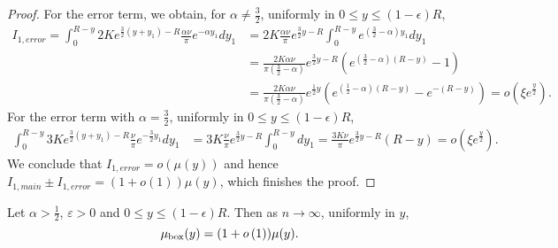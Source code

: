 \begin{proof}
For the error term, we obtain, for $\alpha \not = \frac{3}{2}$, uniformly in $0\leq y\leq (1-\epsilon)R$,
\begin{align*}
I_{1,error}=\int_0^{R-y} 2Ke^{\frac{3}{2}(y+y_1)-R} \frac{\alpha\nu}{\pi} e^{-\alpha y_1} dy_1 &= 2K\frac{\alpha\nu}{\pi} e^{\frac{3}{2}y-R} \int_0^{R-y} e^{\left(\frac{3}{2}-\alpha\right)y_1}dy_1 \\
&= \frac{2K\alpha\nu}{\pi\left(\frac{3}{2}-\alpha\right)}e^{\frac{3}{2}y-R} \left(e^{\left(\frac{3}{2}-\alpha\right)(R-y)}-1\right)\\
&= \frac{2K\alpha\nu}{\pi\left(\frac{3}{2}-\alpha\right)}e^{\frac{1}{2}y} \left(e^{\left(\frac{1}{2}-\alpha\right)(R-y)}-e^{-(R-y)}\right) =o\left(\xi e^{\frac{y}{2}}\right).
\end{align*}
For the error term with $\alpha=\frac{3}{2}$, uniformly in $0\leq y\leq (1-\epsilon)R$,
\begin{align*}
\int_0^{R-y} 3Ke^{\frac{3}{2}(y+y_1)-R} \frac{\nu}{\pi} e^{-\frac{3}{2} y_1} dy_1 &= 3K\frac{\nu}{\pi} e^{\frac{3}{2}y-R} \int_0^{R-y} dy_1 = \frac{3K\nu}{\pi}e^{\frac{3}{2}y-R} (R-y) =o\left(\xi e^{\frac{y}{2}}\right).
\end{align*}
We conclude that $I_{1,error} = o(\mu(y))$ and hence $I_{1,main}\pm I_{1,error} = (1+o(1))\mu(y)$, which finishes the proof.
\end{proof}

\begin{lemma}\label{lem:average_degree_G_box}
Let $\alpha > \frac{1}{2}$, $\varepsilon >0$ and $0 \leq y \leq (1-\epsilon)R$. Then as $n \to \infty$, uniformly in $y$,
\[
	\mu_{\mathrm{box}}(y) = (1+o\left(1\right)) \mu(y).
\]
\end{lemma}

